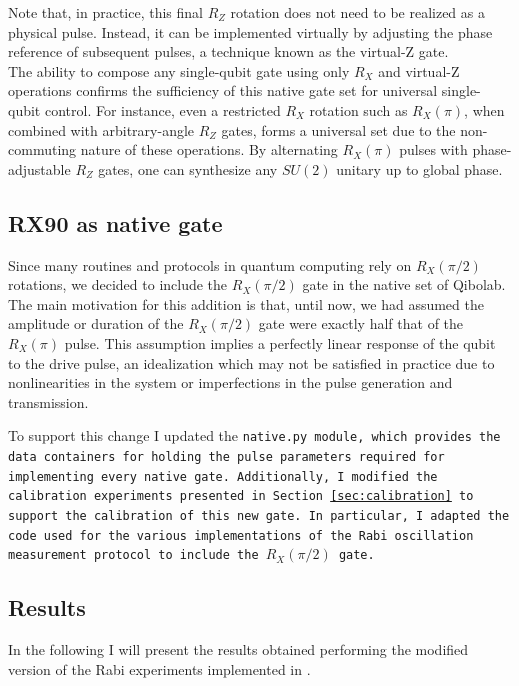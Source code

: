Note that, in practice, this final $R_Z$ rotation does not need to be realized as a physical pulse. 
Instead, it can be implemented virtually by adjusting the phase reference of subsequent pulses, a technique known as the virtual-Z gate\cite{McKay_2017}. \\
The ability to compose any single-qubit gate using only $R_X$ and virtual-Z operations \cite{boykin1999universalfaulttolerantquantumcomputing} confirms the sufficiency of this native gate set for universal single-qubit control. For instance, even a restricted $ R_X $ rotation such as $ R_X(\pi) $, when combined with arbitrary-angle $ R_Z $ gates, forms a universal set due to the non-commuting nature of these operations.
By alternating $ R_X(\pi) $ pulses with phase-adjustable $ R_Z $ gates, one can synthesize any $SU(2)$ unitary up to global phase.

\subsection{RX90 as native gate}
Since many routines and protocols in quantum computing rely on $R_X(\pi/2)$ rotations, we decided to include the $R_X(\pi/2)$ gate in the native set of Qibolab.
The main motivation for this addition is that, until now, we had assumed the amplitude or duration of the $R_X(\pi/2)$ gate were exactly half that of the $R_X(\pi)$ pulse.
This assumption implies a perfectly linear response of the qubit to the drive pulse, an idealization which may not be satisfied in practice due to nonlinearities in the system or imperfections in the pulse generation and transmission.

To support this change I updated the \tt{native.py} module, which provides the data containers for holding the pulse parameters required for implementing every native gate.
Additionally, I modified the calibration experiments presented in Section \ref{sec:calibration} to support the calibration of this new gate.
In particular, I adapted the code used for the various implementations of the Rabi oscillation measurement protocol to include the $R_X(\pi/2)$ gate.

\subsection{Results}
In the following I will present the results obtained performing the modified version of the Rabi experiments implemented in \Qibocal.

